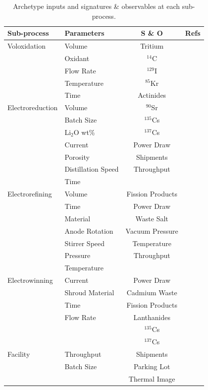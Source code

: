 \begin{table}[h]
	\centering
	\begin{tabularx}{0.9\linewidth}{llcr}
		\hline
		\textbf{Sub-process} & \textbf{Parameters} & \textbf{S \& O} & \textbf{Refs} \\
		\hline
		Voloxidation & Volume & Tritium & \cite{jubin_spent_2009} \\
		& Oxidant & $^{14}$C & \cite{flowsheet_1998} \\
		& Flow Rate &  $^{129}$I &  \\
		& Temperature & $^{85}$Kr &  \\
		& Time & Actinides & \\ \hline
		Electroreduction & Volume & $^{90}$Sr & \cite{borrelli_approaches_2017} \\
		& Batch Size & $^{135}$Cs & \cite{flowsheet_1998} \\
		& Li$_2$O wt\% & $^{137}$Cs & \cite{choi_electrochemical_2015} \\
		& Current & Power Draw & \cite{lee_korean_2011} \\
		& Porosity & Shipments & \cite{lee_modeling_2016} \\
		& Distillation Speed & Throughput & \\ 
		& Time & & \\ \hline
		Electrorefining & Volume & Fission Products & \cite{lee_advanced_2008} \\
		& Time & Power Draw & \cite{lee_korean_2011} \\
		& Material & Waste Salt & \cite{flowsheet_1998} \\
		& Anode Rotation & Vacuum Pressure & \cite{koyama_development_2012} \\
		& Stirrer Speed & Temperature & \cite{kim_development_2013} \\
		& Pressure & Throughput & \\
		& Temperature & & \\ \hline
		Electrowinning & Current & Power Draw & \cite{flowsheet_1998} \\
		& Shroud Material & Cadmium Waste & \cite{lee_korean_2011} \\
		& Time & Fission Products & \cite{borrelli_approaches_2017} \\
		& Flow Rate & Lanthanides & \\
		&  & $^{135}$Cs & \\
		&  & $^{137}$Cs & \\ \hline
		Facility & Throughput & Shipments & \\
		& Batch Size & Parking Lot & \\
		& & Thermal Image & \\
		\hline
	\end{tabularx}
	\caption {Archetype inputs and signatures \& observables at each sub-process.}
	\label {tab:params}
\end{table}

